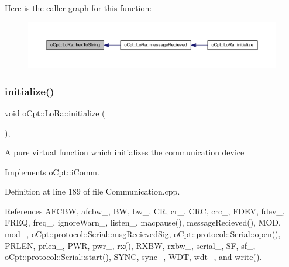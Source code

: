 Here is the caller graph for this function\+:\nopagebreak
\begin{figure}[H]
\begin{center}
\leavevmode
\includegraphics[width=350pt]{classo_cpt_1_1_lo_ra_a9a85cc1457a2e791c4eb4d1805b416fc_icgraph}
\end{center}
\end{figure}
\hypertarget{classo_cpt_1_1_lo_ra_aa0646143f843d43fcd680344dfcb2a14}{}\label{classo_cpt_1_1_lo_ra_aa0646143f843d43fcd680344dfcb2a14} 
\subsubsection{\texorpdfstring{initialize()}{initialize()}}
{\footnotesize\ttfamily void o\+Cpt\+::\+Lo\+Ra\+::initialize (\begin{DoxyParamCaption}{ }\end{DoxyParamCaption})\hspace{0.3cm}{\ttfamily [override]}, {\ttfamily [virtual]}}

A pure virtual function which initializes the communication device 

Implements \hyperlink{classo_cpt_1_1i_comm_aeba385b1daaec5e64c5c573424ab8d24}{o\+Cpt\+::i\+Comm}.



Definition at line 189 of file Communication.\+cpp.



References A\+F\+C\+BW, afcbw\+\_\+, BW, bw\+\_\+, CR, cr\+\_\+, C\+RC, crc\+\_\+, F\+D\+EV, fdev\+\_\+, F\+R\+EQ, freq\+\_\+, ignore\+Warn\+\_\+, listen\+\_\+, macpause(), message\+Recieved(), M\+OD, mod\+\_\+, o\+Cpt\+::protocol\+::\+Serial\+::msg\+Recieved\+Sig, o\+Cpt\+::protocol\+::\+Serial\+::open(), P\+R\+L\+EN, prlen\+\_\+, P\+WR, pwr\+\_\+, rx(), R\+X\+BW, rxbw\+\_\+, serial\+\_\+, SF, sf\+\_\+, o\+Cpt\+::protocol\+::\+Serial\+::start(), S\+Y\+NC, sync\+\_\+, W\+DT, wdt\+\_\+, and write().

